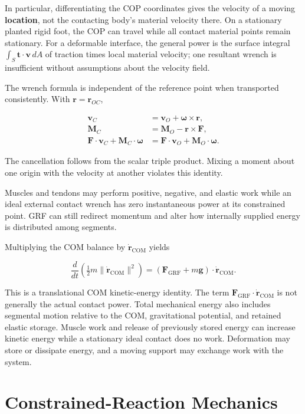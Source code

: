 In particular, differentiating the COP coordinates gives the velocity of a moving \textbf{location}, not the contacting body's material velocity there. On a stationary planted rigid foot, the COP can travel while all contact material points remain stationary. For a deformable interface, the general power is the surface integral \(\int_S\bm t\cdot\bm v\,dA\) of traction times local material velocity; one resultant wrench is insufficient without assumptions about the velocity field.

The wrench formula is independent of the reference point when transported consistently. With \(\bm r=\bm r_{OC}\),

\[
\begin{aligned}
\bm v_C&=\bm v_O+\bm\omega\times\bm r,\\
\bm M_C&=\bm M_O-\bm r\times\bm F,\\
\bm F\cdot\bm v_C+\bm M_C\cdot\bm\omega
&=\bm F\cdot\bm v_O+\bm M_O\cdot\bm\omega.
\end{aligned}
\]

The cancellation follows from the scalar triple product. Mixing a moment about one origin with the velocity at another violates this identity.

Muscles and tendons may perform positive, negative, and elastic work while an ideal external contact wrench has zero instantaneous power at its constrained point. GRF can still redirect momentum and alter how internally supplied energy is distributed among segments.

Multiplying the COM balance by \(\dot{\bm r}_{\mathrm{COM}}\) yields

\[
\frac{d}{dt}\left(\tfrac12m\|\dot{\bm r}_{\mathrm{COM}}\|^2\right)
=(\bm F_{\mathrm{GRF}}+m\bm g)\cdot\dot{\bm r}_{\mathrm{COM}}.
\]

This is a translational COM kinetic-energy identity. The term \(\bm F_{\mathrm{GRF}}\cdot\dot{\bm r}_{\mathrm{COM}}\) is not generally the actual contact power. Total mechanical energy also includes segmental motion relative to the COM, gravitational potential, and retained elastic storage. Muscle work and release of previously stored energy can increase kinetic energy while a stationary ideal contact does no work. Deformation may store or dissipate energy, and a moving support may exchange work with the system.

\section{Constrained-Reaction Mechanics}\label{sec:grf-drift}\label{grf-constrained-reaction-mechanics}

